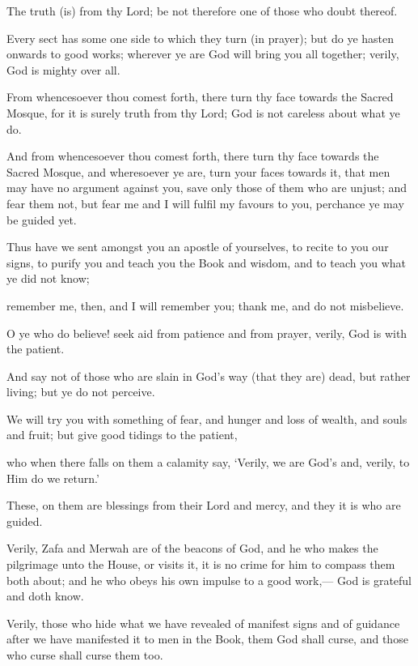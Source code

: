 \documentclass[fontsize=14pt, letterpaper, notitlepage, openany, DIV=12]{scrbook} %
\begin{document}
\noindent[2:147]
The truth (is) from thy Lord; be not therefore one of those who doubt thereof.

\noindent[2:148]
Every sect has some one side to which they turn (in prayer); but do ye hasten onwards to
good works; wherever ye are God will bring you all together; verily, God is mighty over all.

\noindent[2:149]
From whencesoever thou comest forth, there turn thy face towards the Sacred Mosque,
for it is surely truth from thy Lord; God is not careless about what ye do.

\noindent[2:150]
And from whencesoever thou comest forth, there turn thy face towards the Sacred
Mosque, and wheresoever ye are, turn your faces towards it, that men may have no argument
against you, save only those of them who are unjust; and fear them not, but fear me and I will
fulfil my favours to you, perchance ye may be guided yet.

\noindent[2:151]
Thus have we sent amongst you an apostle of yourselves, to recite to you our signs, to
purify you and teach you the Book and wisdom, and to teach you what ye did not know;

\noindent[2:152]
remember me, then, and I will remember you; thank me, and do not misbelieve.

\noindent[2:153]
O ye who do believe! seek aid from patience and from prayer, verily, God is with the
patient.

\noindent[2:154]
And say not of those who are slain in God's way (that they are) dead, but rather living;
but ye do not perceive.

\noindent[2:155]
We will try you with something of fear, and hunger and loss of wealth, and souls and
fruit; but give good tidings to the patient,

\noindent[2:156]
who when there falls on them a calamity say, `Verily, we are God's and, verily, to Him
do we return.'

\noindent[2:157]
These, on them are blessings from their Lord and mercy, and they it is who are guided.

\noindent[2:158]
Verily, Zafa and Merwah are of the beacons of God, and he who makes the pilgrimage
unto the House, or visits it, it is no crime for him to compass them both about; and he who obeys
his own impulse to a good work,--- God is grateful and doth know.

\noindent[2:159]
Verily, those who hide what we have revealed of manifest signs and of guidance after we
have manifested it to men in the Book, them God shall curse, and those who curse shall curse
them too.
\end{document}
